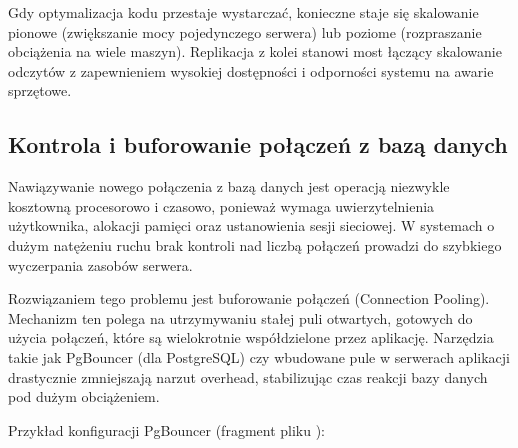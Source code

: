 \documentclass[letterpaper,10pt,polish]{sphinxmanual}
\begin{document}
\sphinxAtStartPar
Gdy optymalizacja kodu przestaje wystarczać, konieczne staje się skalowanie \textendash{} pionowe (zwiększanie mocy pojedynczego serwera) lub poziome (rozpraszanie obciążenia na wiele maszyn). Replikacja z kolei stanowi most łączący skalowanie odczytów z zapewnieniem wysokiej dostępności i odporności systemu na awarie sprzętowe.


\subsection{Kontrola i buforowanie połączeń z bazą danych}
\label{\detokenize{rozdzia_u0142_2/rozdzia_u0142_25/index:kontrola-i-buforowanie-polaczen-z-baza-danych}}
\sphinxAtStartPar
Nawiązywanie nowego połączenia z bazą danych jest operacją niezwykle kosztowną procesorowo i czasowo, ponieważ wymaga uwierzytelnienia użytkownika, alokacji pamięci oraz ustanowienia sesji sieciowej. W systemach o dużym natężeniu ruchu brak kontroli nad liczbą połączeń prowadzi do szybkiego wyczerpania zasobów serwera.

\sphinxAtStartPar
Rozwiązaniem tego problemu jest buforowanie połączeń (Connection Pooling). Mechanizm ten polega na utrzymywaniu stałej puli otwartych, gotowych do użycia połączeń, które są wielokrotnie współdzielone przez aplikację. Narzędzia takie jak PgBouncer (dla PostgreSQL) czy wbudowane pule w serwerach aplikacji drastycznie zmniejszają narzut overhead, stabilizując czas reakcji bazy danych pod dużym obciążeniem.

\sphinxAtStartPar
Przykład konfiguracji PgBouncer (fragment pliku ):

\begin{sphinxVerbatim}[commandchars=\\\{\}]

\end{sphinxVerbatim}
\end{document}
